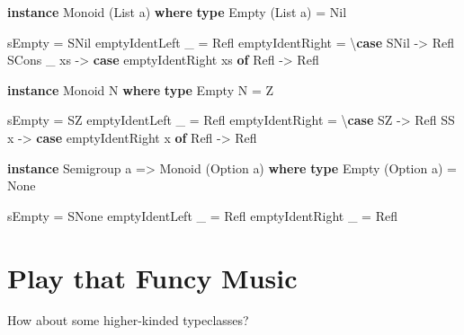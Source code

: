 \documentclass[]{article}
\newenvironment{Shaded}{}{}
\newcommand{\KeywordTok}[1]{\textcolor[rgb]{0.00,0.44,0.13}{\textbf{{#1}}}}
\newcommand{\DataTypeTok}[1]{\textcolor[rgb]{0.56,0.13,0.00}{{#1}}}
\newcommand{\OtherTok}[1]{\textcolor[rgb]{0.00,0.44,0.13}{{#1}}}
\newcommand{\FunctionTok}[1]{\textcolor[rgb]{0.02,0.16,0.49}{{#1}}}
\newcommand{\NormalTok}[1]{{#1}}
\begin{document}
\begin{Shaded}
\begin{Highlighting}[]
\KeywordTok{instance} \DataTypeTok{Monoid} \NormalTok{(}\DataTypeTok{List} \NormalTok{a) }\KeywordTok{where}
    \KeywordTok{type} \DataTypeTok{Empty} \NormalTok{(}\DataTypeTok{List} \NormalTok{a) }\FunctionTok{=} \DataTypeTok{Nil}

    \NormalTok{sEmpty }\FunctionTok{=} \DataTypeTok{SNil}
    \NormalTok{emptyIdentLeft _ }\FunctionTok{=} \DataTypeTok{Refl}
    \NormalTok{emptyIdentRight  }\FunctionTok{=} \NormalTok{\textbackslash{}}\KeywordTok{case}
      \DataTypeTok{SNil} \OtherTok{->} \DataTypeTok{Refl}
      \DataTypeTok{SCons} \NormalTok{_ xs }\OtherTok{->}
        \KeywordTok{case} \NormalTok{emptyIdentRight xs }\KeywordTok{of}
          \DataTypeTok{Refl} \OtherTok{->} \DataTypeTok{Refl}

\KeywordTok{instance} \DataTypeTok{Monoid} \DataTypeTok{N} \KeywordTok{where}
    \KeywordTok{type} \DataTypeTok{Empty} \DataTypeTok{N} \FunctionTok{=} \DataTypeTok{Z}

    \NormalTok{sEmpty }\FunctionTok{=} \DataTypeTok{SZ}
    \NormalTok{emptyIdentLeft _ }\FunctionTok{=} \DataTypeTok{Refl}
    \NormalTok{emptyIdentRight  }\FunctionTok{=} \NormalTok{\textbackslash{}}\KeywordTok{case}
      \DataTypeTok{SZ} \OtherTok{->} \DataTypeTok{Refl}
      \DataTypeTok{SS} \NormalTok{x }\OtherTok{->} \KeywordTok{case} \NormalTok{emptyIdentRight x }\KeywordTok{of}
        \DataTypeTok{Refl} \OtherTok{->} \DataTypeTok{Refl}

\KeywordTok{instance} \DataTypeTok{Semigroup} \NormalTok{a }\OtherTok{=>} \DataTypeTok{Monoid} \NormalTok{(}\DataTypeTok{Option} \NormalTok{a) }\KeywordTok{where}
    \KeywordTok{type} \DataTypeTok{Empty} \NormalTok{(}\DataTypeTok{Option} \NormalTok{a) }\FunctionTok{=} \DataTypeTok{None}

    \NormalTok{sEmpty }\FunctionTok{=} \DataTypeTok{SNone}
    \NormalTok{emptyIdentLeft  _ }\FunctionTok{=} \DataTypeTok{Refl}
    \NormalTok{emptyIdentRight _ }\FunctionTok{=} \DataTypeTok{Refl}
\end{Highlighting}
\end{Shaded}

\section{Play that Funcy Music}\label{play-that-funcy-music}

How about some higher-kinded typeclasses?
\end{document}
